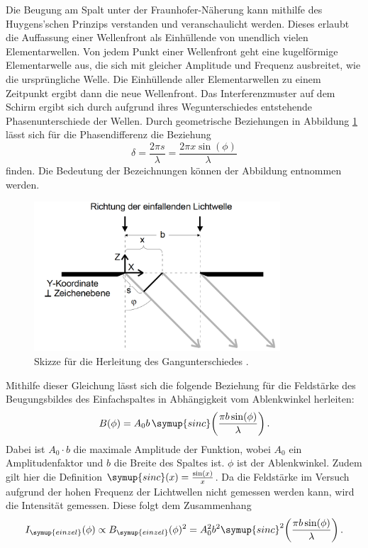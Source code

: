 Die Beugung am Spalt unter der Fraunhofer-Näherung kann mithilfe des Huygens'schen
Prinzips verstanden und veranschaulicht werden. Dieses erlaubt die Auffassung einer
Wellenfront als Einhüllende von unendlich vielen Elementarwellen. Von jedem Punkt
einer Wellenfront geht eine kugelförmige Elementarwelle aus, die sich mit gleicher Amplitude und
Frequenz ausbreitet, wie die ursprüngliche Welle. Die Einhüllende aller Elementarwellen
zu einem Zeitpunkt ergibt dann die neue Wellenfront.
Das Interferenzmuster auf dem Schirm ergibt sich durch aufgrund ihres Wegunterschiedes
entstehende Phasenunterschiede der Wellen. Durch geometrische Beziehungen in
Abbildung \ref{fig:gangunterschied} lässt sich für die Phasendifferenz die
Beziehung
\begin{equation*}
  \delta = \frac{2\pi s}{\lambda} = \frac{2 \pi x \sin(\phi)}{\lambda}
\end{equation*}
finden.
Die Bedeutung der Bezeichnungen können der Abbildung entnommen werden.

\begin{figure}
  \centering
  \includegraphics[width=260pt]{data/gangunterschied.png}
  \caption{Skizze für die Herleitung des Gangunterschiedes \cite{Versuchsanleitung}.}
  \label{fig:gangunterschied}
\end{figure}


Mithilfe dieser Gleichung lässt sich die folgende Beziehung für
die Feldstärke des Beugungsbildes des Einfachspaltes in Abhängigkeit vom Ablenkwinkel herleiten:
\begin{equation*}
  B(\phi)= A_0 b \, \symup{sinc}\biggl(\frac{\pi b \sin(\phi)}{\lambda}\biggr) \,.
\end{equation*}
Dabei ist $A_0 \cdot b$ die maximale Amplitude der Funktion, wobei $A_0$ ein Amplitudenfaktor
und  $b$ die Breite des Spaltes ist.
 $\phi$ ist der Ablenkwinkel. Zudem gilt hier die Definition $\symup{sinc}(x)=\frac{\sin(x)}{x}$.
Da die Feldstärke im Versuch aufgrund der hohen Frequenz der Lichtwellen nicht gemessen
werden kann, wird die Intensität gemessen. Diese folgt dem Zusammenhang
\begin{equation}
  I_{\symup{einzel}}(\phi) \propto B_{\symup{einzel}}(\phi)^2=A_0^2 b^2 \symup{sinc}^2\biggl(\frac{\pi b \sin(\phi)}{\lambda}\biggr)  \,.
  \label{eqn:einzeltheo}
\end{equation}

